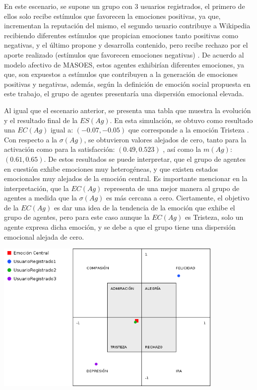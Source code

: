 En este escenario, se supone un grupo con 3 usuarios registrados, el primero de ellos
solo recibe estímulos que favorecen la emociones positivas, ya que, incrementan la reputación del mismo,
el segundo usuario contribuye a Wikipedia recibiendo diferentes estímulos
que propician emociones tanto positivas como negativas, y el último propone
y desarrolla contenido, pero recibe rechazo por el aporte realizado (estímulos
que favorecen emociones negativas) .
De acuerdo al modelo afectivo de MASOES, estos agentes exhibirían diferentes emociones,
ya que, son expuestos a estímulos que contribuyen a la generación de emociones positivas y negativas,
además, según la definición de emoción social propuesta en este trabajo,
el grupo de agentes presentaría una dispersión emocional elevada.

Al igual que el escenario anterior, se presenta una tabla 
que muestra la evolución y el resultado final de la $ES(Ag)$.
En esta simulación, se obtuvo como resultado una $EC(Ag)$ igual a: $(-0.07, -0.05)$
que corresponde a la emoción Tristeza .
Con respecto a la $\sigma(Ag)$, se obtuvieron valores alejados de cero,
tanto para la activación como para la satisfacción: $(0.49, 0.523)$ ,
así como la $m(Ag)$: $(0.61, 0.65)$. De estos resultados se puede interpretar,
que el grupo de agentes en cuestión exhibe emociones muy heterogéneas, y que
existen estados emocionales muy alejados de la emoción central.
Es importante mencionar en la interpretación, que la $EC(Ag)$
representa de una mejor manera al grupo de agentes a medida que la $\sigma(Ag)$ es más cercana a cero.
Ciertamente, el objetivo de la $EC(Ag)$ es dar una idea de la tendencia de
la emoción que exhibe el grupo de agentes, pero para este caso
aunque la $EC(Ag)$ es Tristeza, solo un agente expresa dicha emoción,
y se debe a que el grupo tiene
una dispersión emocional alejada de cero.

\begin{ilustracion}[fuente=\yo, etiqueta=emocion-central-final-caso1escenario2, titulo={Emoción Central Final, Caso de Estudio 1 Escenario 2}]
\includegraphics[width=11cm]{ilustraciones/resultados/caso1escenario2-emocioncentral.png}
\end{ilustracion}

